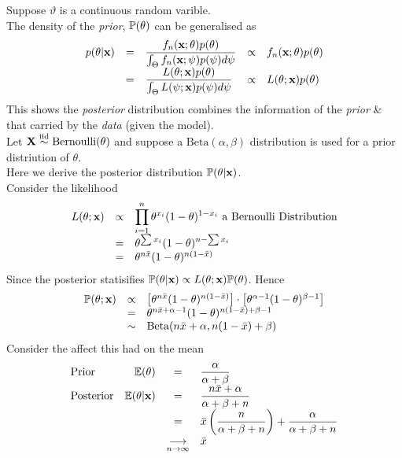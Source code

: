 \documentclass[11pt,a4paper]{article}
\begin{document}
Suppose $\vartheta$ is a continuous random varible.\\
The density of the \textit{prior}, $\mathbb{P}(\theta)$ can be generalised as
\[\begin{array}{rclcl}
p(\theta|\textbf{x})&=&\dfrac{f_n(\textbf{x};\theta)p(\theta)}{\int_\Theta f_n(\textbf{x};\psi)p(\psi)d\psi}&\propto&f_n(\textbf{x};\theta)p(\theta)\\
&=&\dfrac{L(\theta;\textbf{x})p(\theta)}{\int_\Theta L(\psi;\textbf{x})p(\psi)d\psi}&\propto&L(\theta;\textbf{x})p(\theta)
\end{array}\]
This shows the \textit{posterior} distribution combines the information of the \textit{prior} \& that carried by the \textit{data} (given the model).\\

Let $\textbf{X}\overset{\text{iid}}{\sim}\text{Bernoulli}(\theta)$ and suppose a $\text{Beta}(\alpha,\beta)$ distribution is used for a prior distriution of $\theta$.\\
Here we derive the posterior distribution $\mathbb{P}(\theta|\textbf{x})$.\\
Consider the likelihood
\[\begin{array}{rcl}
L(\theta;\textbf{x})&\propto&\displaystyle\prod_{i=1}^n\theta^{x_i}(1-\theta)^{1-x_i}\text{ a Bernoulli Distribution}\\
&=&\theta^{\sum x_i}(1-\theta)^{n-\sum x_i}\\
&=&\theta^{n\bar{x}}(1-\theta)^{n(1-\bar{x})}
\end{array}\]
Since the posterior statisifies $\mathbb{P}(\theta|\textbf{x})\propto L(\theta;\textbf{x})\mathbb{P}(\theta)$. Hence
\[\begin{array}{rcl}
\mathbb{P}(\theta;\textbf{x})&\propto&\left[\theta^{n\bar{x}}(1-\theta)^{n(1-\bar{x})}\right]\cdot\left[\theta^{\alpha-1}(1-\theta)^{\beta-1}\right]\\
&=&\theta^{n\bar{x}+\alpha-1}(1-\theta)^{n(1-\bar{x})+\beta-1}\\
&\sim&\text{Beta}(n\bar{x}+\alpha,n(1-\bar{x})+\beta)
\end{array}\]
Consider the affect this had on the mean
\[\begin{array}{lrcl}
\text{Prior}&\mathbb{E}(\theta)&=&\dfrac{\alpha}{\alpha+\beta}\\
\text{Posterior}&\mathbb{E}(\theta|\textbf{x})&=&\dfrac{n\bar{x}+\alpha}{\alpha+\beta+n}\\
&&=&\bar{x}\left(\dfrac{n}{\alpha+\beta+n}\right)+\dfrac{\alpha}{\alpha+\beta+n}\\
&&\underset{n\to\infty}{\longrightarrow}&\bar{x}
\end{array}\]
\end{document}
